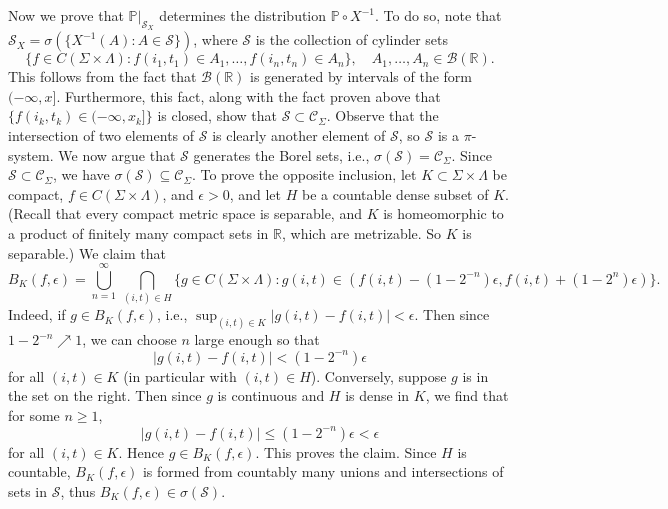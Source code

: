 \documentclass[12pt]{article}
\begin{document}
		Now we prove that $\mathbb{P}|_{\mathcal{S}_X}$ determines the distribution $\mathbb{P}\circ X^{-1}$. To do so, note that $\mathcal{S}_X = \sigma(\{X^{-1}(A) : A\in\mathcal{S}\})$, where $\mathcal{S}$ is the collection of cylinder sets
		\[
		\{f\in C(\Sigma\times\Lambda) : f(i_1,t_1)\in A_1, \dots, f(i_n,t_n) \in A_n\}, \quad A_1,\dots,A_n\in\mathcal{B}(\mathbb{R}). 
		\]
		This follows from the fact that $\mathcal{B}(\mathbb{R})$ is generated by intervals of the form $(-\infty,x]$. Furthermore, this fact, along with the fact proven above that $\{f(i_k,t_k)\in (-\infty,x_k]\}$ is closed, show that $\mathcal{S}\subset\mathcal{C}_\Sigma$. Observe that the intersection of two elements of $\mathcal{S}$ is clearly another element of $\mathcal{S}$, so $\mathcal{S}$ is a $\pi$-system. We now argue that $\mathcal{S}$ generates the Borel sets, i.e., $\sigma(\mathcal{S}) = \mathcal{C}_\Sigma$. Since $\mathcal{S}\subset \mathcal{C}_\Sigma$, we have $\sigma(\mathcal{S})\subseteq \mathcal{C}_\Sigma$. To prove the opposite inclusion, let $K\subset\Sigma\times\Lambda$ be compact, $f\in C(\Sigma\times\Lambda)$, and $\epsilon>0$, and let $H$ be a countable dense subset of $K$. (Recall that every compact metric space is separable, and $K$ is homeomorphic to a product of finitely many compact sets in $\mathbb{R}$, which are metrizable. So $K$ is separable.) We claim that
		\[
		B_K(f,\epsilon) = \bigcup_{n=1}^\infty\,\bigcap_{(i,t)\in H} \{g\in C(\Sigma\times\Lambda) : g(i,t) \in  (f(i,t)-(1-2^{-n})\epsilon, f(i,t) + (1-2^{n})\epsilon)\}.
		\]
		Indeed, if $g\in B_K(f,\epsilon)$, i.e., $\sup_{(i,t)\in K} |g(i,t)-f(i,t)| < \epsilon$. Then since $1-2^{-n}\nearrow 1$, we can choose $n$ large enough so that 
		\[
		|g(i,t)-f(i,t)| < (1-2^{-n})\epsilon
		\] 
		for all $(i,t)\in K$ (in particular with $(i,t)\in H$). Conversely, suppose $g$ is in the set on the right. Then since $g$ is continuous and $H$ is dense in $K$, we find that for some $n\geq 1$,
		\[
		|g(i,t)-f(i,t)| \leq (1-2^{-n})\epsilon < \epsilon
		\]
		for all $(i,t)\in K$. Hence $g\in B_K(f,\epsilon)$. This proves the claim. Since $H$ is countable, $B_K(f,\epsilon)$ is formed from countably many unions and intersections of sets in $\mathcal{S}$, thus $B_K(f,\epsilon)\in\sigma(\mathcal{S})$.
		
\end{document}
